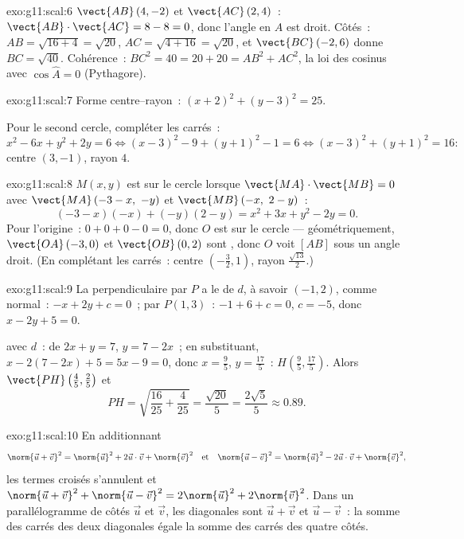 \begin{solution}{exo:g11:scal:6}
$\vect{AB}\,(4, -2)$ et $\vect{AC}\,(2, 4)$~:
$\vect{AB}\cdot\vect{AC} = 8 - 8 = 0$, donc l'angle en $A$ est droit.
Côtés~: $AB = \sqrt{16 + 4} = \sqrt{20}$, $AC = \sqrt{4 + 16} =
\sqrt{20}$, et $\vect{BC}\,(-2, 6)$ donne $BC = \sqrt{40}$.
Cohérence~: $BC^2 = 40 = 20 + 20 = AB^2 + AC^2$, la loi des cosinus avec
$\cos\widehat A = 0$ (Pythagore).
\end{solution}

\begin{solution}{exo:g11:scal:7}
Forme centre--rayon~: $(x + 2)^2 + (y - 3)^2 = 25$.

Pour le second cercle, compléter les carrés~:
\[
x^2 - 6x + y^2 + 2y = 6
\iff (x - 3)^2 - 9 + (y + 1)^2 - 1 = 6
\iff (x-3)^2 + (y+1)^2 = 16 :
\]
centre $(3, -1)$, rayon $4$.
\end{solution}

\begin{solution}{exo:g11:scal:8}
$M(x,y)$ est sur le cercle lorsque $\vect{MA}\cdot\vect{MB} = 0$ avec
$\vect{MA}\,(-3 - x,\ -y)$ et $\vect{MB}\,(-x,\ 2 - y)$~:
\[
(-3 - x)(-x) + (-y)(2 - y) = x^2 + 3x + y^2 - 2y = 0 .
\]
Pour l'origine~: $0 + 0 + 0 - 0 = 0$, donc $O$ est sur le cercle ---
géométriquement, $\vect{OA}\,(-3,0)$ et $\vect{OB}\,(0,2)$ sont
, donc $O$ voit $[AB]$ sous un angle droit. (En complétant les
carrés~: centre $\left(-\frac32, 1\right)$, rayon
$\frac{\sqrt{13}}{2}$.)
\end{solution}

\begin{solution}{exo:g11:scal:9}
La perpendiculaire par $P$ a le  de $d$, à savoir
$(-1, 2)$, comme  normal~:  $-x + 2y + c = 0$~; par
$P(1,3)$~: $-1 + 6 + c = 0$, $c = -5$, donc $x - 2y + 5 = 0$.

 avec $d$~: de $2x + y = 7$, $y = 7 - 2x$~; en substituant,
$x - 2(7 - 2x) + 5 = 5x - 9 = 0$, donc $x = \frac95$, $y = \frac{17}5$~:
$H\left(\frac95, \frac{17}5\right)$. Alors
$\vect{PH}\left(\frac45, \frac25\right)$ et
\[
PH = \sqrt{\frac{16}{25} + \frac{4}{25}} = \frac{\sqrt{20}}{5}
= \frac{2\sqrt5}{5} \approx 0.89 .
\]
\end{solution}

\begin{solution}{exo:g11:scal:10}
En additionnant
\[
\norm{\vec u + \vec v}^2 = \norm{\vec u}^2 + 2\vec u\cdot\vec v +
\norm{\vec v}^2
\quad\text{et}\quad
\norm{\vec u - \vec v}^2 = \norm{\vec u}^2 - 2\vec u\cdot\vec v +
\norm{\vec v}^2,
\]
les termes croisés s'annulent et
$\norm{\vec u + \vec v}^2 + \norm{\vec u - \vec v}^2 = 2\norm{\vec u}^2 +
2\norm{\vec v}^2$. Dans un parallélogramme de côtés $\vec u$ et $\vec v$,
les diagonales sont $\vec u + \vec v$ et $\vec u - \vec v$~: la somme des
carrés des deux diagonales égale la somme des carrés des quatre côtés.
\end{solution}

